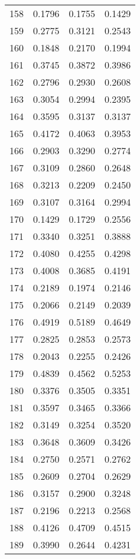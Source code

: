 \begin{table}[ht]
\begin{tabular}{|c|c|c|c|}
158  &  0.1796   &  0.1755   &  0.1429 \\ 
159  &  0.2775   &  0.3121   &  0.2543 \\ 
160  &  0.1848   &  0.2170   &  0.1994 \\ 
161  &  0.3745   &  0.3872   &  0.3986 \\ 
162  &  0.2796   &  0.2930   &  0.2608 \\ 
163  &  0.3054   &  0.2994   &  0.2395 \\ 
164  &  0.3595   &  0.3137   &  0.3137 \\ 
165  &  0.4172   &  0.4063   &  0.3953 \\ 
166  &  0.2903   &  0.3290   &  0.2774 \\ 
167  &  0.3109   &  0.2860   &  0.2648 \\ 
168  &  0.3213   &  0.2209   &  0.2450 \\ 
169  &  0.3107   &  0.3164   &  0.2994 \\ 
170  &  0.1429   &  0.1729   &  0.2556 \\ 
171  &  0.3340   &  0.3251   &  0.3888 \\ 
172  &  0.4080   &  0.4255   &  0.4298 \\ 
173  &  0.4008   &  0.3685   &  0.4191 \\ 
174  &  0.2189   &  0.1974   &  0.2146 \\ 
175  &  0.2066   &  0.2149   &  0.2039 \\ 
176  &  0.4919   &  0.5189   &  0.4649 \\ 
177  &  0.2825   &  0.2853   &  0.2573 \\ 
178  &  0.2043   &  0.2255   &  0.2426 \\ 
179  &  0.4839   &  0.4562   &  0.5253 \\ 
180  &  0.3376   &  0.3505   &  0.3351 \\ 
181  &  0.3597   &  0.3465   &  0.3366 \\ 
182  &  0.3149   &  0.3254   &  0.3520 \\ 
183  &  0.3648   &  0.3609   &  0.3426 \\ 
184  &  0.2750   &  0.2571   &  0.2762 \\ 
185  &  0.2609   &  0.2704   &  0.2629 \\ 
186  &  0.3157   &  0.2900   &  0.3248 \\ 
187  &  0.2196   &  0.2213   &  0.2568 \\ 
188  &  0.4126   &  0.4709   &  0.4515 \\ 
189  &  0.3990   &  0.2644   &  0.4231 \\ 

\end{tabular}
\end{table}
